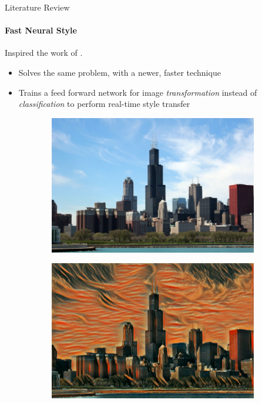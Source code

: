 \documentclass{beamer}
\begin{document}
\begin{frame}[allowframebreaks]{Literature Review}
    \framesubtitle{Fast Neural Style}
    Inspired the work of .
    \begin{itemize}
        \item Solves the same problem, with a newer, faster technique
        \item Trains a feed forward network for image \textit{transformation}
        instead of \textit{classification} to perform real-time style transfer
    \end{itemize}
    \begin{figure}[H]
        \centering
        \begin{subfigure}[b]{.45\textwidth}
            \includegraphics[width=\textwidth]{img/fast-neural-style/chicago.jpg}
        \end{subfigure}
        \begin{subfigure}[b]{.45\textwidth}
            \includegraphics[width=\textwidth]{img/fast-neural-style/chicago_scream.jpg}

\end{subfigure}
\end{figure}
\end{frame}
\end{document}
